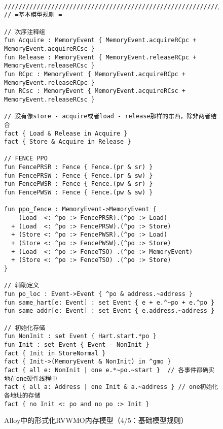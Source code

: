 \begin{figure}[h!]
  {
  \tt\bfseries\centering\footnotesize
  \begin{lstlisting}
////////////////////////////////////////////////////////////////////////////////
// =基本模型规则 =

// 次序注释组
fun Acquire : MemoryEvent { MemoryEvent.acquireRCpc + MemoryEvent.acquireRCsc }
fun Release : MemoryEvent { MemoryEvent.releaseRCpc + MemoryEvent.releaseRCsc }
fun RCpc : MemoryEvent { MemoryEvent.acquireRCpc + MemoryEvent.releaseRCpc }
fun RCsc : MemoryEvent { MemoryEvent.acquireRCsc + MemoryEvent.releaseRCsc }

// 没有像store - acquire或者load - release那样的东西，除非两者结合
fact { Load & Release in Acquire }
fact { Store & Acquire in Release }

// FENCE PPO
fun FencePRSR : Fence { Fence.(pr & sr) }
fun FencePRSW : Fence { Fence.(pr & sw) }
fun FencePWSR : Fence { Fence.(pw & sr) }
fun FencePWSW : Fence { Fence.(pw & sw) }

fun ppo_fence : MemoryEvent->MemoryEvent {
    (Load  <: ^po :> FencePRSR).(^po :> Load)
  + (Load  <: ^po :> FencePRSW).(^po :> Store)
  + (Store <: ^po :> FencePWSR).(^po :> Load)
  + (Store <: ^po :> FencePWSW).(^po :> Store)
  + (Load  <: ^po :> FenceTSO) .(^po :> MemoryEvent)
  + (Store <: ^po :> FenceTSO) .(^po :> Store)
}

// 辅助定义
fun po_loc : Event->Event { ^po & address.~address }
fun same_hart[e: Event] : set Event { e + e.^~po + e.^po }
fun same_addr[e: Event] : set Event { e.address.~address }

// 初始化存储
fun NonInit : set Event { Hart.start.*po }
fun Init : set Event { Event - NonInit }
fact { Init in StoreNormal }
fact { Init->(MemoryEvent & NonInit) in ^gmo }
fact { all e: NonInit | one e.*~po.~start }  // 各事件都确实地在one硬件线程中
fact { all a: Address | one Init & a.~address } // one初始化各地址的存储
fact { no Init <: po and no po :> Init }
\end{lstlisting}}
  \caption{Alloy中的形式化RVWMO内存模型（4/5：基础模型规则）}
  \label{fig:alloy4}
\end{figure}

